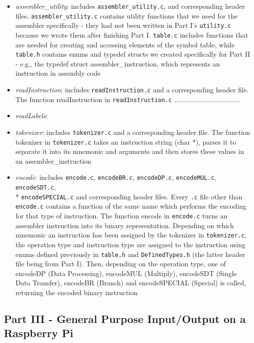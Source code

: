 \documentclass[letterpaper,11pt]{article}
\begin{document}
    \begin{itemize}
        \item \textit{assembler\_utility}: includes \texttt{assembler\_utility.c},  and corresponding header files. \texttt{assembler\_utility.c} contains utility functions that we need for the assembler specifically - they had not been written in Part I's \texttt{utility.c} because we wrote them after finishing Part I. \texttt{table.c} includes functions that are needed for creating and accessing elements of the symbol table, while \texttt{table.h} contains enums and typedef structs we created specifically for Part II - e.g., the typedef struct assembler\_instruction, which represents an instruction in assembly code
        \item \textit{readInstruction}: includes \texttt{readInstruction.c} and a corresponding header file. The function readInstruction in \texttt{readInstruction.c} ...................................
        \item \textit{readLabels}:
        \item \textit{tokenizer}: includes \texttt{tokenizer.c} and a corresponding header file. The function tokenizer in \texttt{tokenizer.c} takes an instruction string (char *), parses it to separate it into its mnemonic and arguments and then stores these values in an assembler\_instruction
        \item \textit{encode}: includes \texttt{encode.c}, \texttt{encodeBR.c}, \texttt{encodeDP.c}, \texttt{encodeMUL.c}, \texttt{encodeSDT.c}, \\* \texttt{encodeSPECIAL.c} and corresponding header files. Every \texttt{.c} file other than \texttt{encode.c} contains a function of the same name which performs the encoding for that type of instruction. The function encode in \texttt{encode.c} turns an assembler instruction into its binary representation. Depending on which mnemonic an instruction has been assigned by the tokenizer in \texttt{tokenizer.c}, the operation type and instruction type are assigned to the instruction using enums defined previously in \texttt{table.h} and \texttt{DefinedTypes.h} (the latter header file being from Part I). Then, depending on the operation type, one of encodeDP (Data Processing), encodeMUL (Multiply), encodeSDT (Single Data Transfer), encodeBR (Branch) and encodeSPECIAL (Special) is called, returning the encoded binary instruction

    \end{itemize}

    \subsection{Part III - General Purpose Input/Output on a Raspberry Pi}
\end{document}
